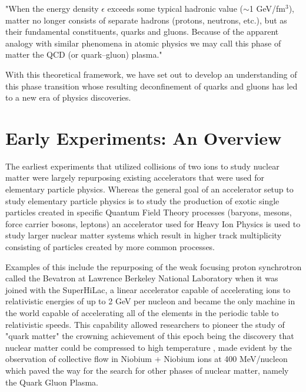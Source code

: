 \begin{addmargin}[1.5em]{2em}
"When the energy density $\epsilon$ exceeds some typical hadronic value ($\sim$1 GeV/fm$^{3}$), matter no longer consists of separate hadrons (protons, neutrons, etc.), but as their fundamental constituents, quarks and gluons. Because of the apparent analogy with similar phenomena in atomic physics we may call this phase of matter the QCD (or quark–gluon) plasma."
\end{addmargin}
 
With this theoretical framework, we have set out to develop an understanding of this phase transition whose resulting deconfinement of quarks and gluons has led to a new era of physics discoveries.

\section{Early Experiments: An Overview}
The earliest experiments that utilized collisions of two ions to study nuclear matter were largely repurposing existing accelerators that were used for elementary particle physics. Whereas the general goal of an accelerator setup to study elementary particle physics is to study the production of exotic single particles created in specific Quantum Field Theory processes (baryons, mesons, force carrier bosons, leptons) an accelerator used for Heavy Ion Physics is used to study larger nuclear matter systems which result in higher track multiplicity consisting of particles created by more common processes. 

Examples of this include the repurposing of the weak focusing proton synchrotron called the Bevatron at Lawrence Berkeley National Laboratory when it was joined with the SuperHiLac, a linear accelerator capable of accelerating ions to relativistic energies of up to 2 GeV per nucleon and became the only machine in the world capable of accelerating all of the elements in the periodic table to relativistic speeds. This capability allowed researchers to pioneer the study of "quark matter" \citep{bevalac9lives} the crowning achievement of this epoch being the discovery that nuclear matter could be compressed to high temperature \citep{ROBINSON857}, made evident by the observation of collective flow in Niobium + Niobium ions at 400 MeV/nucleon \citep{PhysRevLett.52.1590} which paved the way for the search for other phases of nuclear matter, namely the Quark Gluon Plasma.

